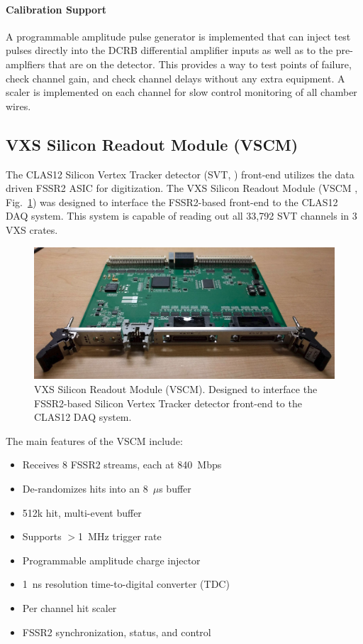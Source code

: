 \paragraph{Calibration Support}
A programmable amplitude pulse generator is implemented that can inject test pulses directly into the DCRB differential amplifier inputs as well as to the pre-amplfiers that are on the detector. This provides a way to test points of failure, check channel gain, and check channel delays without any extra equipment. A scaler is implemented on each channel for slow control monitoring of all chamber wires.

\subsection{VXS Silicon Readout Module (VSCM)}
The CLAS12 Silicon Vertex Tracker detector (SVT, \cite{svt-ref}) front-end utilizes the data driven FSSR2 ASIC for digitization. The VXS Silicon Readout Module (VSCM \cite{vscm-ref}, Fig.~\ref{fig:vscm_board}) was designed to interface the FSSR2-based front-end to the CLAS12 DAQ system. This system is capable of reading out all 33,792 SVT channels in 3 VXS crates.

\begin{figure}[hbt]
	\centering
	\includegraphics[width=1.0\columnwidth,keepaspectratio]{img/vscm_board.png}
	\caption{VXS Silicon Readout Module (VSCM). Designed to interface the FSSR2-based Silicon Vertex Tracker detector front-end to the CLAS12 DAQ system.}
	\label{fig:vscm_board}
\end{figure}

The main features of the VSCM include:

\begin{itemize}
	\item Receives 8 FSSR2 streams, each at 840~Mbps
	\item De-randomizes hits into an 8~$\mu$s buffer
	\item 512k hit, multi-event buffer
	\item Supports $>$1~MHz trigger rate
	\item Programmable amplitude charge injector
	\item 1~ns resolution time-to-digital converter (TDC)
	\item Per channel hit scaler
	\item FSSR2 synchronization, status, and control
\end{itemize}

